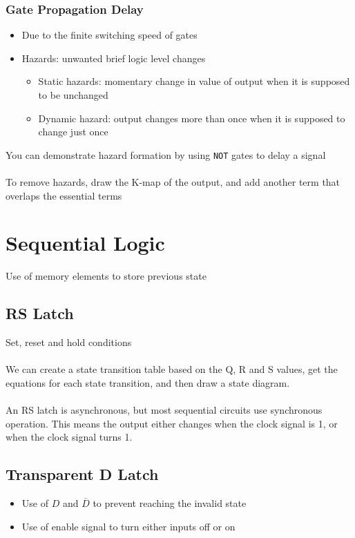 \documentclass[12pt,a4paper]{article} %
\begin{document}
\subsubsection{Gate Propagation Delay}
\begin{itemize}
\item Due to the finite switching speed of gates
\item Hazards: unwanted brief logic level changes
	\begin{itemize}
	\item Static hazards: momentary change in value of output when it is supposed to be unchanged
	\item Dynamic hazard: output changes more than once when it is supposed to change just once
	\end{itemize}
\end{itemize}
You can demonstrate hazard formation by using \verb|NOT| gates to delay a signal
\\\\
To remove hazards, draw the K-map of the output, and add another term that overlaps the essential terms
\section{Sequential Logic}
Use of memory elements to store previous state
\subsection{RS Latch}
Set, reset and hold conditions
\\\\
We can create a state transition table based on the Q, R and S values, get the equations for each state transition, and then draw a state diagram.
\\\\
An RS latch is asynchronous, but most sequential circuits use synchronous operation. This means the output either changes when the clock signal is 1, or when the clock signal turns 1.
\subsection{Transparent D Latch}
\begin{itemize}
\item Use of $D$ and $\overline{D}$ to prevent reaching the invalid state
\item Use of enable signal to turn either inputs off or on
\end{itemize}
\end{document}

